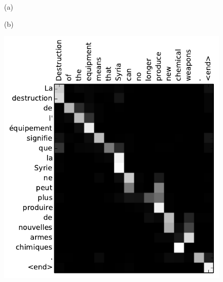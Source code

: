 \documentclass{report}
\begin{document}
\begin{figure}[ht]
    \begin{minipage}{0.48\textwidth}
        \centering
        (a)
    \end{minipage}
    \hfill
    \begin{minipage}{0.48\textwidth}
        \centering
        (b)
    \end{minipage}

    \begin{minipage}[b]{0.48\textwidth}
        \raggedleft
        \includegraphics[width=1.\columnwidth]{figures/2799.pdf}
    \end{minipage}
    \hfill
    \begin{minipage}[b]{0.48\textwidth}
        \raggedleft

\end{minipage}
\end{figure}
\end{document}
